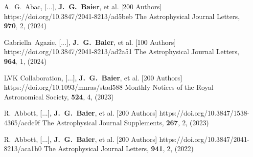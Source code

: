          {A.~G.~{Abac}, [...], \textbf{J.~G.~{Baier}}, et al. [200 Authors]}
         {https://doi.org/10.3847/2041-8213/ad5beb}
         {{The Astrophysical Journal Letters}, \textbf{970}, 2, (2024)}

         {Gabriella~{Agazie}, [...], \textbf{J.~G.~{Baier}}, et al. [100 Authors]}
         {https://doi.org/10.3847/2041-8213/ad2a51}
         {{The Astrophysical Journal Letters}, \textbf{964}, 1, (2024)}

         {{LVK Collaboration}, [...], \textbf{J.~G.~{Baier}}, et al. [200 Authors]}
         {https://doi.org/10.1093/mnras/stad588}
         {{Monthly Notices of the Royal Astronomical Society}, \textbf{524}, 4, (2023)}

         {R.~{Abbott}, [...], \textbf{J.~G.~{Baier}}, et al. [200 Authors]}
         {https://doi.org/10.3847/1538-4365/acdc9f}
         {{The Astrophysical Journal Supplements}, \textbf{267}, 2, (2023)}

         {R.~{Abbott}, [...], \textbf{J.~G.~{Baier}}, et al. [200 Authors]}
         {https://doi.org/10.3847/2041-8213/aca1b0}
         {{The Astrophysical Journal Letters}, \textbf{941}, 2, (2022)}

